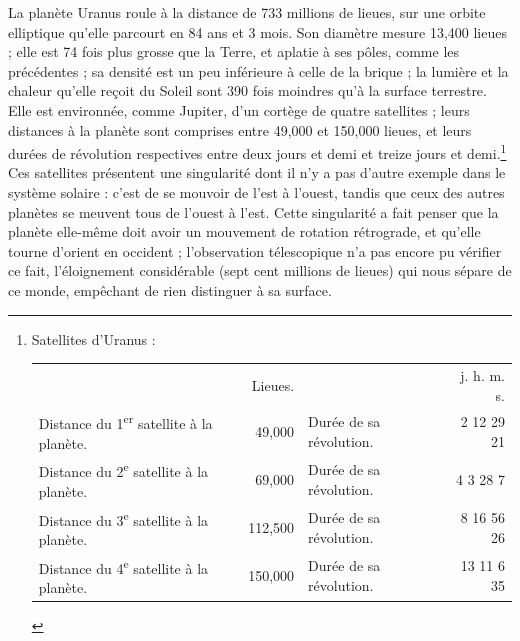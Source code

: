 \documentclass[a4paper, 11pt, oneside]{article}
\begin{document}
La planète Uranus roule à la distance de 733 millions de lieues, sur une orbite elliptique qu'elle parcourt en 84 ans et 3 mois. Son diamètre mesure 13,400 lieues ; elle est 74 fois plus grosse que la Terre, et aplatie à ses pôles, comme les précédentes ; sa densité est un peu inférieure à celle de la brique ; la lumière et la chaleur qu'elle reçoit du Soleil sont 390 fois moindres qu'à la surface terrestre. Elle est environnée, comme Jupiter, d'un cortège de quatre satellites ; leurs distances à la planète sont comprises entre 49,000 et 150,000 lieues, et leurs durées de révolution respectives entre deux jours et demi et treize jours et demi.\footnote{Satellites d'Uranus :\\
\begin{table}[H]
    \centering
    \footnotesize
    \Fontauri
    \begin{tabular}{p{35mm} r p{30mm} r}
        ~ & Lieues. & ~ & j. h. m. s.   \\
        Distance du 1\textsuperscript{er} satellite à la planète. & 49,000 & Durée de sa révolution. & 2 12 29 21   \\
        Distance du 2\textsuperscript{e} satellite à la planète. & 69,000 & Durée de sa révolution. & 4 3 28 7   \\
        Distance du 3\textsuperscript{e} satellite à la planète. & 112,500 & Durée de sa révolution. & 8 16 56 26   \\
        Distance du 4\textsuperscript{e} satellite à la planète. & 150,000 & Durée de sa révolution. & 13 11 6 35 \\
    \end{tabular}
\end{table}} Ces satellites présentent une singularité dont il n'y a pas d'autre exemple dans le système solaire : c'est de se mouvoir de l'est à l'ouest, tandis que ceux des autres planètes se meuvent tous de l'ouest à l'est. Cette singularité a fait penser que la planète elle-même doit avoir un mouvement de rotation rétrograde, et qu'elle tourne d'orient en occident ; l'observation télescopique n'a pas encore pu vérifier ce fait, l'éloignement considérable (sept cent millions de lieues) qui nous sépare de ce monde, empêchant de rien distinguer à sa surface.
\end{document}
